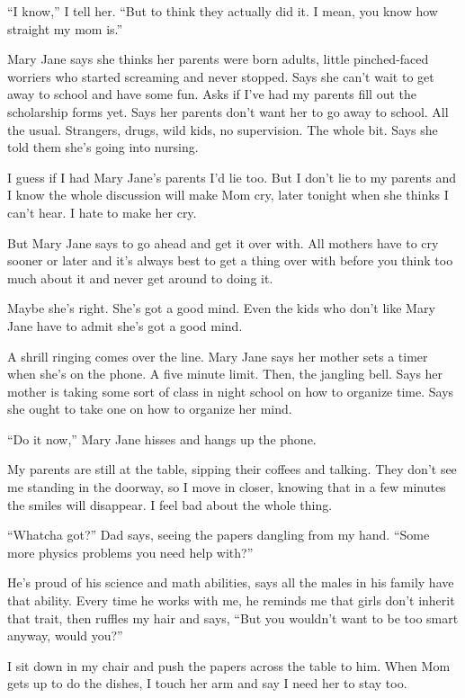 \documentclass[twoside,10pt]{book}
\begin{document}
``I know,'' I tell her. ``But to think they actually did it. I mean, you
know how straight my mom is.''

Mary Jane says she thinks her parents were born adults, little
pinched-faced worriers who started screaming and never stopped. Says she
can't wait to get away to school and have some fun. Asks if I've had my
parents fill out the scholarship forms yet. Says her parents don't want
her to go away to school. All the usual. Strangers, drugs, wild kids, no
supervision. The whole bit. Says she told them she's going into nursing.

I guess if I had Mary Jane's parents I'd lie too. But I don't lie to my
parents and I know the whole discussion will make Mom cry, later tonight
when she thinks I can't hear. I hate to make her cry.

But Mary Jane says to go ahead and get it over with. All mothers have to
cry sooner or later and it's always best to get a thing over with before
you think too much about it and never get around to doing it.

Maybe she's right. She's got a good mind. Even the kids who don't like
Mary Jane have to admit she's got a good mind.

A shrill ringing comes over the line. Mary Jane says her mother sets a
timer when she's on the phone. A five minute limit. Then, the jangling
bell. Says her mother is taking some sort of class in night school on
how to organize time. Says she ought to take one on how to organize her
mind.

``Do it now,'' Mary Jane hisses and hangs up the phone.

My parents are still at the table, sipping their coffees and talking.
They don't see me standing in the doorway, so I move in closer, knowing
that in a few minutes the smiles will disappear. I feel bad about the
whole thing.

``Whatcha got?'' Dad says, seeing the papers dangling from my hand.
``Some more physics problems you need help with?''

He's proud of his science and math abilities, says all the males in his
family have that ability. Every time he works with me, he reminds me
that girls don't inherit that trait, then ruffles my hair and says,
``But you wouldn't want to be too smart anyway, would you?''

I sit down in my chair and push the papers across the table to him. When
Mom gets up to do the dishes, I touch her arm and say I need her to stay
too.
\end{document}

